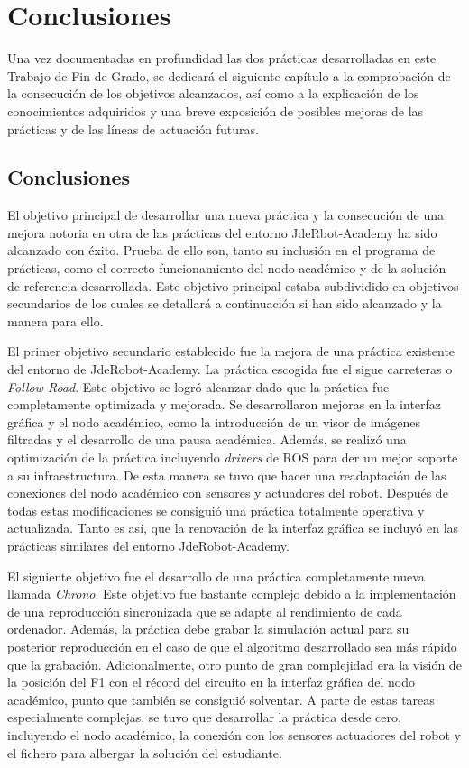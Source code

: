 \chapter{Conclusiones}\label{cap.conclusiones}
Una vez documentadas en profundidad las dos prácticas desarrolladas en este Trabajo de Fin de Grado, se dedicará el siguiente capítulo a la comprobación de la consecución de los objetivos alcanzados, así como a la explicación de los conocimientos adquiridos y una breve exposición de posibles mejoras de las prácticas y de las líneas de actuación futuras.

\section{Conclusiones}
El objetivo principal de desarrollar una nueva práctica y la consecución de una mejora notoria en otra de las prácticas del entorno JdeRbot-Academy ha sido alcanzado con éxito. Prueba de ello son, tanto su inclusión en el programa de prácticas, como el correcto funcionamiento del nodo académico y de la solución de referencia desarrollada. Este objetivo principal estaba subdividido en objetivos secundarios de los cuales se detallará a continuación si han sido alcanzado y la manera para ello.

El primer objetivo secundario establecido fue la mejora de una práctica existente del entorno de JdeRobot-Academy. La práctica escogida fue el sigue carreteras o \textit{Follow Road}. Este objetivo se logró alcanzar dado que la práctica fue completamente optimizada y mejorada. Se desarrollaron mejoras en la interfaz gráfica y el nodo académico, como la introducción de un visor de imágenes filtradas y el desarrollo de una pausa académica. Además, se realizó una optimización de la práctica incluyendo \textit{drivers} de ROS para der un mejor soporte a su infraestructura. De esta manera se tuvo que hacer una readaptación de las conexiones del nodo académico con sensores y actuadores del robot. Después de todas estas modificaciones se consiguió una práctica totalmente operativa y actualizada. Tanto es así, que la renovación de la interfaz gráfica se incluyó en las prácticas similares del entorno JdeRobot-Academy.

El siguiente objetivo fue el desarrollo de una práctica completamente nueva llamada \textit{Chrono}. Este objetivo fue bastante complejo debido a la implementación de una reproducción sincronizada que se adapte al rendimiento de cada ordenador. Además, la práctica debe grabar la simulación actual para su posterior reproducción en el caso de que el algoritmo desarrollado sea más rápido que la grabación. Adicionalmente, otro punto de gran complejidad era la visión de la posición del F1 con el récord del circuito en la interfaz gráfica del nodo académico, punto que también se consiguió solventar. A parte de estas tareas especialmente complejas, se tuvo que desarrollar la práctica desde cero, incluyendo el nodo académico, la conexión con los sensores actuadores del robot y el fichero para albergar la solución del estudiante.

